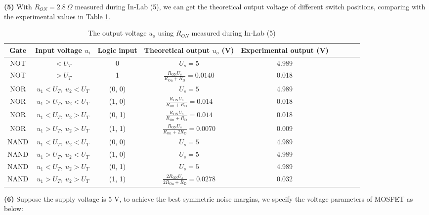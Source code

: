 \documentclass[UTF8]{report}
\theoremstyle{MyLineTheoremStyle} %
\theoremstyle{MyBlockTheoremStyle} %
\theoremstyle{MySubsubsectionStyle} %
\begin{document}
\noindent\textbf{(5)} With $R_{ON} = 2.8 \ \Omega$ measured during In-Lab (5), we can get the theoretical output voltage of different switch positions, comparing with the experimental values in Table \ref{The output voltage using RON measured during In-Lab (5)}.

\begin{table}[H]\centering
    \caption{The output voltage $u_o$ using $R_{ON}$ measured during In-Lab (5)}
    \label{The output voltage using RON measured during In-Lab (5)}
\begin{tabular}{ccccccccc}\toprule
    Gate & Input voltage $u_i$ & Logic input   & Theoretical output $u_o$ (V) & Experimental output (V) \\
    \hline
    NOT  & $< U_T$ & 0 &  $U_s = 5$ & 4.989 \\
    NOT  & $> U_T$ & 1 &  $\frac{R_{\text{ON}}U_s}{R_{\text{On}}+R_\text{D}} = 0.0140$ & 0.018 \\
    NOR  & $u_1 < U_T,\ u_2 < U_T $ & (0, 0) & $U_s = 5$ & 4.989\\
    NOR  & $u_1 > U_T,\ u_2 < U_T $ & (1, 0) & $\frac{R_{\text{ON}}U_s}{R_{\text{On}}+R_\text{D}} = 0.014$ & 0.018 \\
    NOR  & $u_1 < U_T,\ u_2 > U_T $ & (0, 1) & $\frac{R_{\text{ON}}U_s}{R_{\text{On}}+R_\text{D}} = 0.014$ & 0.018 \\
    NOR  & $u_1 > U_T,\ u_2 > U_T $ & (1, 1) & $\frac{R_{\text{ON}}U_s}{R_{\text{On}}+2R_\text{D}} = 0.0070$ & 0.009 \\
    NAND & $u_1 < U_T,\ u_2 < U_T $ & (0, 0) & $U_s = 5$ & 4.989 \\
    NAND & $u_1 > U_T,\ u_2 < U_T $ & (1, 0) & $U_s = 5$ & 4.989 \\
    NAND & $u_1 < U_T,\ u_2 > U_T $ & (0, 1) & $U_s = 5$ & 4.989 \\
    NAND & $u_1 > U_T,\ u_2 > U_T $ & (1, 1) & $\frac{2R_{\text{ON}}U_s}{2R_{\text{On}}+R_\text{D}} = 0.0278$ & 0.032\\
    \bottomrule
\end{tabular}
\end{table}

\noindent\textbf{(6)} Suppose the supply voltage is 5 V, to achieve the best symmetric noise margins, we specify the voltage parameters of MOSFET as below:
\end{document}
